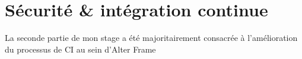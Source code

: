 \section{Sécurité \& intégration continue}
La seconde partie de mon stage a été majoritairement consacrée à l'amélioration
du processus de CI au sein d'Alter Frame 